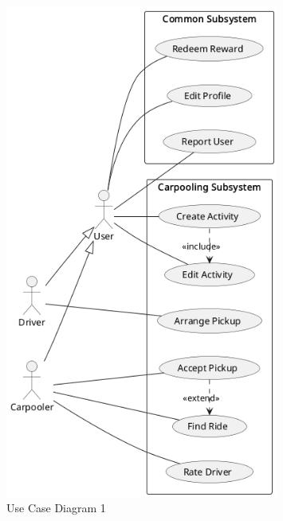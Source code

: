 \documentclass[11pt]{article}
\begin{document}
\begin{figure}
    \centering
    \includegraphics[width=0.8\textwidth]{use-cases-carpooling}
    \caption{Use Case Diagram 1}
\end{figure}
\end{document}
